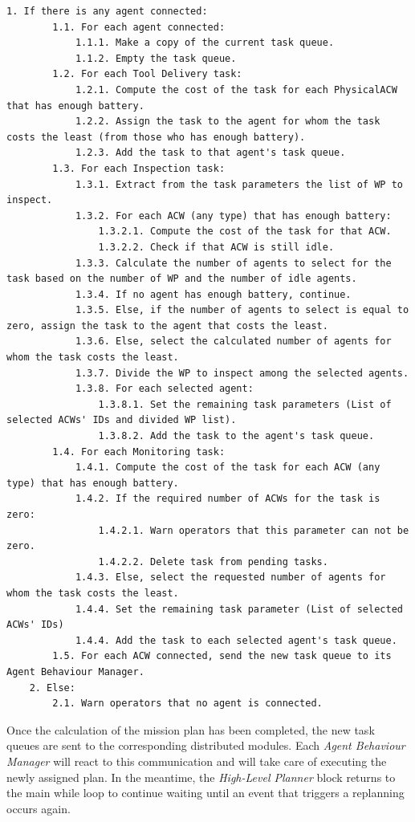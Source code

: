 \documentclass[fontsize=11pt, English=false, Español=true, Myfinal=true, twoside, numbers=noenddot]{scrbook}
\begin{document}
\begin{lstlisting}[caption={Task planning function's pseudocode}, breaklines=true, label=ps:performTaskAllocation]
	1. If there is any agent connected:
		1.1. For each agent connected:
			1.1.1. Make a copy of the current task queue.
			1.1.2. Empty the task queue.
		1.2. For each Tool Delivery task:
			1.2.1. Compute the cost of the task for each PhysicalACW that has enough battery.
			1.2.2. Assign the task to the agent for whom the task costs the least (from those who has enough battery).
			1.2.3. Add the task to that agent's task queue.
		1.3. For each Inspection task:
			1.3.1. Extract from the task parameters the list of WP to inspect.
			1.3.2. For each ACW (any type) that has enough battery:
				1.3.2.1. Compute the cost of the task for that ACW. 
				1.3.2.2. Check if that ACW is still idle.
			1.3.3. Calculate the number of agents to select for the task based on the number of WP and the number of idle agents.
			1.3.4. If no agent has enough battery, continue.
			1.3.5. Else, if the number of agents to select is equal to zero, assign the task to the agent that costs the least.
			1.3.6. Else, select the calculated number of agents for whom the task costs the least.
			1.3.7. Divide the WP to inspect among the selected agents.
			1.3.8. For each selected agent:
				1.3.8.1. Set the remaining task parameters (List of selected ACWs' IDs and divided WP list).
				1.3.8.2. Add the task to the agent's task queue.
		1.4. For each Monitoring task:
			1.4.1. Compute the cost of the task for each ACW (any type) that has enough battery.
			1.4.2. If the required number of ACWs for the task is zero:
				1.4.2.1. Warn operators that this parameter can not be zero.
				1.4.2.2. Delete task from pending tasks.
			1.4.3. Else, select the requested number of agents for whom the task costs the least.
			1.4.4. Set the remaining task parameter (List of selected ACWs' IDs)
			1.4.4. Add the task to each selected agent's task queue.
		1.5. For each ACW connected, send the new task queue to its Agent Behaviour Manager.
	2. Else:
		2.1. Warn operators that no agent is connected.
\end{lstlisting}

Once the calculation of the mission plan has been completed, the new task queues are sent to the corresponding distributed modules. Each \emph{Agent Behaviour Manager} will react to this communication and will take care of executing the newly assigned plan. In the meantime, the \emph{High-Level Planner} block returns to the main while loop to continue waiting until an event that triggers a replanning occurs again.
\end{document}
